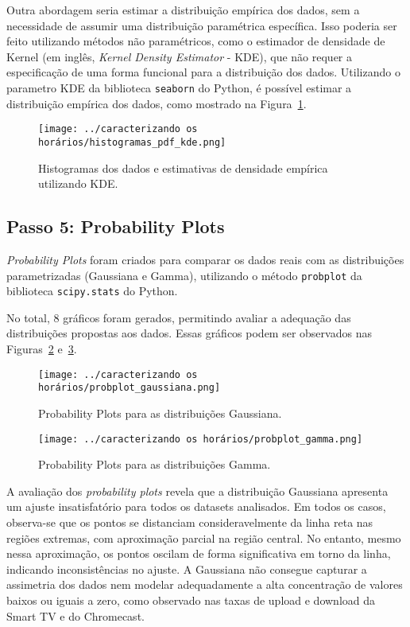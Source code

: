 Outra abordagem seria estimar a distribuição empírica dos dados, sem a necessidade de assumir uma distribuição paramétrica específica. Isso poderia ser feito utilizando métodos não paramétricos, como o estimador de densidade de Kernel (em inglês, \textit{Kernel Density Estimator} - KDE), que não requer a especificação de uma forma funcional para a distribuição dos dados. Utilizando o parametro KDE da biblioteca \texttt{seaborn} do Python, é possível estimar a distribuição empírica dos dados, como mostrado na Figura~\ref{fig:histogramas_pdf_kde}.

\begin{figure}[H]
    \centering
    \texttt{[image: ../caracterizando os horários/histogramas\_pdf\_kde.png]}
    \caption{Histogramas dos dados e estimativas de densidade empírica utilizando KDE.}
    \label{fig:histogramas_pdf_kde}
\end{figure}

\subsection{Passo 5: Probability Plots}

\textit{Probability Plots} foram criados para comparar os dados reais com as distribuições parametrizadas (Gaussiana e Gamma), utilizando o método \texttt{probplot} da biblioteca \texttt{scipy.stats} do Python.

No total, 8 gráficos foram gerados, permitindo avaliar a adequação das distribuições propostas aos dados. Essas gráficos podem ser observados nas Figuras~\ref{fig:probplot_gaussiana} e~\ref{fig:probplot_gamma}.

\begin{figure}[H]
    \centering
    \texttt{[image: ../caracterizando os horários/probplot\_gaussiana.png]}
    \caption{Probability Plots para as distribuições Gaussiana.}
    \label{fig:probplot_gaussiana}
\end{figure}

\begin{figure}[H]
    \centering
    \texttt{[image: ../caracterizando os horários/probplot\_gamma.png]}
    \caption{Probability Plots para as distribuições Gamma.}
    \label{fig:probplot_gamma}
\end{figure}

A avaliação dos \textit{probability plots} revela que a distribuição Gaussiana apresenta um ajuste insatisfatório para todos os datasets analisados. Em todos os casos, observa-se que os pontos se distanciam consideravelmente da linha reta nas regiões extremas, com aproximação parcial na região central. No entanto, mesmo nessa aproximação, os pontos oscilam de forma significativa em torno da linha, indicando inconsistências no ajuste. A Gaussiana não consegue capturar a assimetria dos dados nem modelar adequadamente a alta concentração de valores baixos ou iguais a zero, como observado nas taxas de upload e download da Smart TV e do Chromecast.

